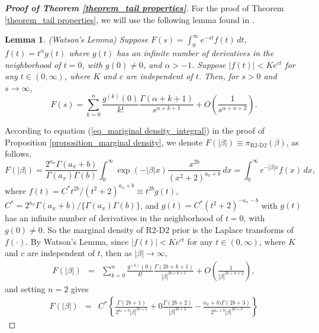 \documentclass[12pt]{article}
\newtheorem{lemma}{Lemma}
\begin{document}
\begin{proof} [\textbf{Proof of Theorem \ref{theorem_tail properties}}]
	For the proof of Theorem \ref{theorem_tail properties}, we will use the following lemma found in \cite{miller2006applied}.
	\begin{lemma} (Watson's Lemma)
		Suppose  $F(s) = \int_{ 0}^\infty e^{-st} f(t) \, dt$,   $f(t) = t^\alpha g(t)$  where $g(t)$ has an infinite number of derivatives in the neighborhood of $t=0$,   with $g(0)\neq 0$, and $\alpha>-1$.
		Suppose  $|f(t)| < Ke^{ct}$ for any $t\in (0,\infty)$, where $K$ and $c$ are independent of $t$. Then,
		for $s>0$ and $s\rightarrow\infty$,
		\[
		F(s) = \sum\limits_{k=0}^n \frac{g^{(k)}(0)} {k!}   \frac{\Gamma(\alpha+k+1)}{s^{\alpha+k+1}} + O(\frac{1}{s^{\alpha+n+2}}).
		\]
	\end{lemma}
	According to  equation (\ref{eq_mariginal density_integral})  in the proof of Proposition \ref{proposition_marginal density},  we denote
	$F(|\beta|) \equiv	\pi_{\text{R2-D2}}(\beta) $, as follows,
	\[
	F(|\beta|) = \frac{2^{a_\pi}\Gamma(a_\pi+b)}{\Gamma(a_\pi)\Gamma(b)}   \int_{ 0}^\infty   \exp(- |\beta|x ) \frac{x^{ 2b}}{(x^2+2)^{a_\pi+b}}  \, dx  =   \int_{ 0}^\infty   e^{- |\beta|x} f(x)  \, dx ,
	\]
	where  $f(t) =C^\ast  {t^{ 2b}} / {(t^2+2)^{a_\pi+b}}  \equiv t^{ 2b} g(t) $,
	$C^\ast = {2^{a_\pi}\Gamma(a_\pi+b)}/ \{\Gamma(a_\pi)\Gamma(b)\}$, and $g(t) = C^\ast(t^2+2)^{-a_\pi-b}$ with $g(t)$ has an infinite number of derivatives in the neighborhood of $t=0$,   with $g(0)\neq 0$.   So the marginal density of R2-D2 prior  is the Laplace transforms of $f(\cdot)$.  By Watson's Lemma,  since $|f(t)| < Ke^{ct}$ for any $t\in (0,\infty)$, where $K$ and $c$ are independent of $t$, then as $|\beta|\rightarrow \infty$,
	\begin{eqnarray*}
		F(|\beta|) &= &  \sum\limits_{k=0}^n  \frac{g^{(k)}(0)}{k!} \frac{\Gamma(2b+k+1)}{|\beta|^{2b+k+1}} + O(\frac{1}{|\beta|^{2b+n+2}}) ,
	\end{eqnarray*} and setting $n=2$ gives
	\begin{eqnarray}
		F(|\beta|)&=& C^\ast\left\{  \frac{\Gamma(2b+1)}{ 2^{a_\pi+b} |\beta|^{2b+1}} + 0\frac{\Gamma(2b+2)}{|\beta|^{2b+2}}  -  \frac{a_\pi+b)\Gamma(2b+3)}{ 2^{a_\pi+b}|\beta|^{2b+3}} \right\}

\end{eqnarray}
\end{proof}
\end{document}
